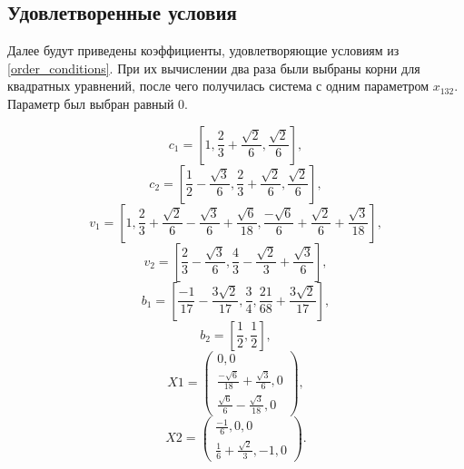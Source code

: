 \documentclass[a4paper,article,14pt]{extarticle}
\begin{document}
\subsection{Удовлетворенные условия}\label{conditions}
Далее будут приведены коэффициенты, удовлетворяющие условиям из \ref{order_conditions}. При их вычислении два раза были выбраны корни для квадратных уравнений, после чего получилась система с одним параметром $x_{132}$. Параметр был выбран равный 0.

\begin{equation}
    c_{1} = \left[
    1, \frac{2}{3} + \frac{\sqrt{2}}{6}, \frac{\sqrt{2}}{6}
    \right],
\end{equation}
\begin{equation}
    c_{2} = \left[
    \frac{1}{2} - \frac{\sqrt{3}}{6}, \frac{2}{3} + \frac{\sqrt{2}}{6}, \frac{\sqrt{2}}{6}
    \right],
\end{equation}
\begin{equation}
    v_{1} = \left[
    1, \frac{2}{3} + \frac{\sqrt{2}}{6} - \frac{\sqrt{3}}{6} + \frac{\sqrt{6}}{18}, \frac{-\sqrt{6}}{6} + \frac{\sqrt{2}}{6} + \frac{\sqrt{3}}{18}
    \right],
\end{equation}
\begin{equation}
    v_{2} = \left[
    \frac{2}{3} - \frac{\sqrt{3}}{6}, \frac{4}{3} - \frac{\sqrt{2}}{3} + \frac{\sqrt{3}}{6}
    \right],
\end{equation}
\begin{equation}
    b_{1} = \left[
    \frac{-1}{17} - \frac{3\sqrt{2}}{17}, \frac{3}{4}, \frac{21}{68} + \frac{3\sqrt{2}}{17}
    \right],
\end{equation}
\begin{equation}
    b_{2} = \left[
    \frac{1}{2}, \frac{1}{2}
    \right],
\end{equation}
\begin{equation}
X1 = 
\begin{pmatrix}
    0, 0\\
    \frac{-\sqrt{6}}{18} + \frac{\sqrt{3}}{6}, 0\\
    \frac{\sqrt{6}}{6} - \frac{\sqrt{3}}{18}, 0
\end{pmatrix},
\end{equation}
\begin{equation}
X2 = 
\begin{pmatrix}
    \frac{-1}{6}, 0, 0\\
    \frac{1}{6} + \frac{\sqrt{2}}{3}, -1, 0
\end{pmatrix}.
\end{equation}
\end{document}

